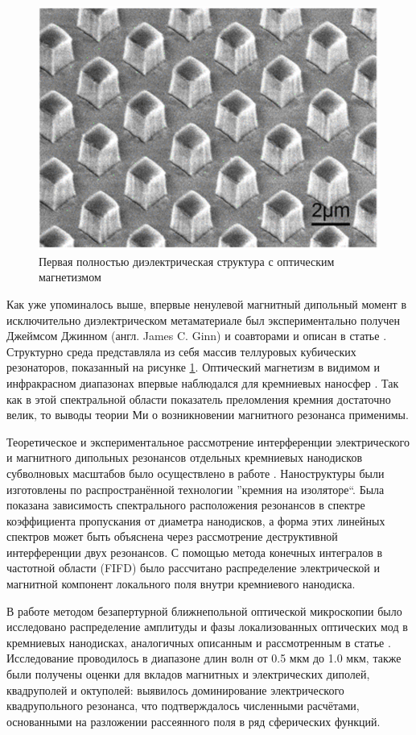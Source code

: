 \begin{figure}[h]
	\centering
	\includegraphics[width=.7\textwidth]{img/Ginn}
	\caption{Первая полностью диэлектрическая структура с оптическим магнетизмом \cite{Ginn2012}}
	\label{fig:ginn}
\end{figure}

Как уже упоминалось выше, впервые ненулевой магнитный дипольный момент в исключительно диэлектрическом метаматериале был экспериментально получен Джеймсом Джинном (англ. James C. Ginn) и соавторами и описан в статье \cite{Ginn2012}. Структурно среда представляла из себя массив теллуровых кубических резонаторов, показанный на рисунке \ref{fig:ginn}. Оптический магнетизм в видимом и инфракрасном диапазонах впервые наблюдался для кремниевых наносфер \cite{Evlyukhin2012a, Kuznetsov2012}. Так как в этой спектральной области показатель преломления кремния достаточно велик, то выводы теории Ми о возникновении магнитного резонанса \cite{Zhao2009} применимы.

Теоретическое и экспериментальное рассмотрение интерференции электрического и магнитного дипольных резонансов отдельных кремниевых нанодисков субволновых масштабов было осуществлено в работе \cite{Staude2013}. Наноструктуры были изготовлены по распространённой технологии ''кремния на изоляторе``. Была показана зависимость спектрального расположения резонансов в спектре коэффициента пропускания от диаметра нанодисков, а форма этих линейных спектров может быть объяснена через рассмотрение деструктивной интерференции двух резонансов. С помощью метода конечных интегралов в частотной области (FIFD) было рассчитано распределение электрической и магнитной компонент локального поля внутри кремниевого нанодиска.

В работе \cite{Habteyes2014} методом безапертурной ближнепольной оптической микроскопии было исследовано распределение амплитуды и фазы локализованных оптических мод в кремниевых нанодисках, аналогичных описанным и рассмотренным в статье \cite{Staude2013}. Исследование проводилось в диапазоне длин волн от 0.5 мкм до 1.0 мкм, также были получены оценки для вкладов магнитных и электрических диполей, квадруполей и октуполей: выявилось доминирование электрического квадрупольного резонанса, что подтверждалось численными расчётами, основанными на разложении рассеянного поля в ряд сферических функций.


